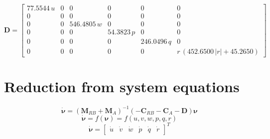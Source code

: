 \documentclass[12pt,a4]{article}
\begin{document}
\begin{equation*}
	\bm{D}  = \left[\begin{array}{cccccc} 77.5544\,u & 0 & 0 & 0 & 0 & 0\\ 0 & 0 & 0 & 0 & 0 & 0\\ 0 & 0 & 546.4805\,w & 0 & 0 & 0\\ 0 & 0 & 0 & 54.3823\,p & 0 & 0\\ 0 & 0 & 0 & 0 & 246.0496\,q & 0\\ 0 & 0 & 0 & 0 & 0 & r\,\left(452.6500\,\left|r\right|+45.2650\right) \end{array}\right]
\end{equation*}


\section{Reduction from system equations}
\begin{equation}
	\dot{\bm{\nu}} = (\bm{M}_{RB}+\bm{M}_{A})^{-1}(-\bm{C}_{RB}-\bm{C}_{A}-\bm{D})\bm{\nu}
\end{equation}
\begin{equation}
	\dot{\bm{\nu}} = f(\bm{\nu}) = f(u, v, w, p, q, r)
\end{equation}
\begin{equation}
	\dot{\bm{\nu}} = \begin{bmatrix}\dot{u}&\dot{v}&\dot{w}&\dot{p}&\dot{q}&\dot{r}\end{bmatrix}^T
\end{equation}
\end{document}

